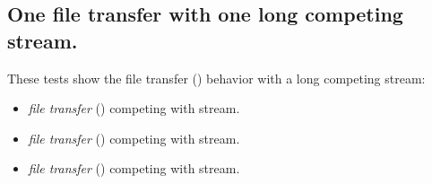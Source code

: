 \documentclass[a4paper]{article}
\begin{document}
    \subsection{One file transfer with one long competing stream.}
        These tests show the file transfer () behavior with a long competing
        stream:
        \begin{itemize}
            \item{
                 \textit{ file transfer} () competing with
                      stream.
            }
            \item{
                 \textit{ file transfer} () competing with
                      stream.
            }
            \item{
                 \textit{ file transfer} () competing with
                      stream.
            }
        \end{itemize}
\end{document}
